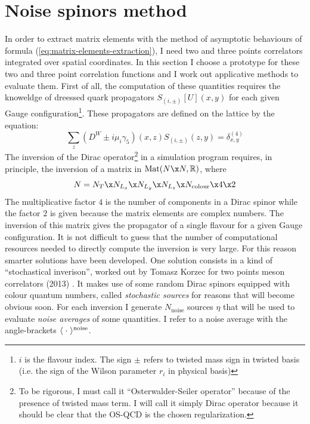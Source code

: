 \documentclass[english, LaM, oneside, noexaminfo]{sapthesis}
\begin{document}
\section{Noise spinors method}
\noindent
In order to extract matrix elements with the method of asymptotic behaviours of formula (\ref{eq:matrix-elements-extraction}), I need two and three points correlators integrated over spatial coordinates.
In this section I choose a prototype for these two and three point correlation functions and I work out applicative methods to evaluate them.
\newline
First of all, the computation of these quantities requires the knoweldge of dreessed quark propagators $S_{(i,\pm)}[U](x,y)$ for each given Gauge configuration\footnote{$i$ is the flavour index. The sign $\pm$ refers to twisted mass sign in twisted basis (i.e. the sign of the Wilson parameter $r_i$ in physical basis)}.
These propagators are defined on the lattice by the equation:
\begin{equation*}
    \sum_{z} \left(D^W\pm i\mu_i \gamma_5\right)(x,z) S_{(i,\pm)}(z,y) = \delta_{x,y}^{(4)}
\end{equation*}
The inversion of the Dirac operator\footnote{To be rigorous, I must call it ``Osterwalder-Seiler operator'' because of the presence of twisted mass term. I will call it simply Dirac operator because it should be clear that the OS-QCD is the chosen regularization.}
in a simulation program requires, in principle, the inversion of a matrix in $\text{Mat}(N\x N,\mathbb{R})$, where
$$N = N_T \x N_{L_x} \x N_{L_y} \x N_{L_z} \x N_\text{colour} \x 4 \x 2 $$
The multiplicative factor $4$ is the number of components in a Dirac spinor while the factor $2$ is given because the matrix elements are complex numbers.
The inversion of this matrix gives the propagator of a single flavour for a given Gauge configuration.
It is not difficult to guess that the number of computational resources needed to directly compute the inversion is very large.
For this reason smarter solutions have been developed.
\newline
One solution consists in a kind of ``stochastical inverison'', worked out by Tomasz Korzec for two points meson correlators (2013) \cite{korzec}.
It makes use of some random Dirac spinors equipped with colour quantum numbers, called \textit{stochastic sources} for reasons that will become obvious soon.
For each inversion I generate $N_\text{noise}$ sources $\eta$ that will be used to evaluate \textit{noise averages} of some quantities.
I refer to a noise average with the angle-brackets $\langle\hspace{1mm}\cdot\hspace{1mm}\rangle^\text{noise}$. 
\end{document}

